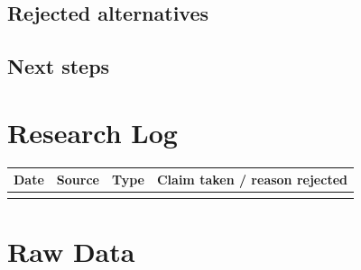 \documentclass[11pt,a4paper]{article}
\begin{document}
\subsection{Rejected alternatives}

\subsection{Next steps}

\printbibliography[heading=bibnumbered]

\appendix

\section{Research Log}

\begin{table}[h]
\centering
\begin{tabular}{@{}llll@{}}
\toprule
Date & Source & Type & Claim taken / reason rejected \\
\midrule
 & & & \\
\bottomrule
\end{tabular}
\end{table}

\section{Raw Data}
\end{document}
